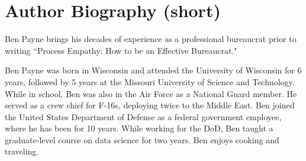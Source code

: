 \section*{Author Biography (short)}

Ben Payne brings his decades of experience as a professional bureaucrat prior to writing ``Process Empathy: How to be an Effective Bureaucrat."

Ben Payne was born in Wisconsin and attended the University of Wisconsin for 6 years, followed by 5 years at the Missouri University of Science and Technology. While in school, Ben was also in the Air Force as a National Guard member. He served as a crew chief for F-16s, deploying twice to the Middle East. Ben joined the United States Department of Defense as a federal government employee, where he has been for 10 years. While working for the DoD, Ben taught a graduate-level course on data science for two years. Ben enjoys cooking and traveling. 

